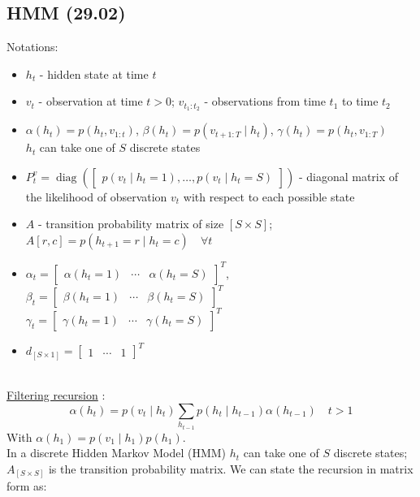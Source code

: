 \documentclass[oneside,12pt]{article}
\begin{document}
\subsection{HMM (29.02)}
Notations:
\begin{itemize}
    \item $h_t$ - hidden state at time $t$ 
    \item $v_t$ - observation at time $t>0$; $v_{t_1:t_2}$ - observations from time $t_1$ to time $t_2$
    \item $\alpha(h_t) = p(h_t, v_{1:t})$, $\beta(h_t) = p(v_{t+1:T} \mid h_t)$, $\gamma(h_t) = p(h_t, v_{1:T})$\\$h_t$ can take one of $S$ discrete states
    \item $P^v_t = \operatorname{diag}\left(\begin{bmatrix} p(v_t \mid h_t=1), \ldots , p(v_t \mid h_t=S) \end{bmatrix}\right)$ - diagonal matrix of the likelihood of observation $v_t$ with respect to each possible state
    \item $A$ - transition probability matrix of size $[S \times S]$; $A[r,c]=p(h_{t+1}=r \mid h_t=c) \quad \forall{t}$
    \item $\alpha_t = \begin{bmatrix} \alpha(h_t=1)& \cdots &\alpha(h_t=S) \end{bmatrix}^T$, $\beta_t = \begin{bmatrix} \beta(h_t=1)& \cdots &\beta(h_t=S) \end{bmatrix}^T$\\$\gamma_t = \begin{bmatrix} \gamma(h_t=1)& \cdots &\gamma(h_t=S) \end{bmatrix}^T$
    \item $d_{[S \times 1]} = \begin{bmatrix} 1& \cdots& 1\end{bmatrix}^T$
\end{itemize}
\\%
\underline{Filtering recursion} \cite{barber2012bayesian}:
\begin{equation}\label{eq:filteringRecursion}
    \alpha(h_t) = p(v_t \mid h_t) \sum_{h_{t-1}} p(h_t \mid h_{t-1}) \alpha(h_{t-1})\quad t>1
\end{equation}
%
With $\alpha(h_1) = p(v_1 \mid h_1)p(h_1)$.\\
In a discrete Hidden Markov Model (HMM) $h_t$ can take one of $S$ discrete states; $A_{[S \times S]}$ is the transition probability matrix. We can state the recursion in matrix form as:
\end{document}
